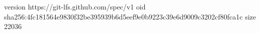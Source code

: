 version https://git-lfs.github.com/spec/v1
oid sha256:4fc181564e9830f32be395939b6d5eef9e0b9223c39e6d9009c3202cf80fca1c
size 22036
